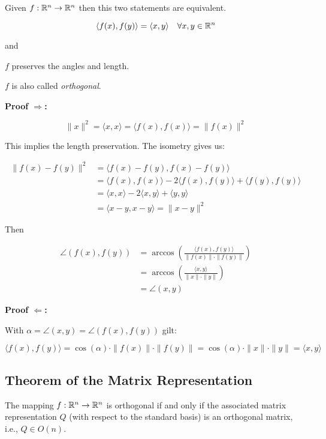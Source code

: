 Given \(f: \mathbb{R}^n \to \mathbb{R}^n\) then this two statements are equivalent.

\[
    \langle f(x), f(y) \rangle = \langle x, y \rangle \quad \forall x,y \in \mathbb{R}^n
\]

and 

\(f\) preserves the angles and length.

\(f\) is also called \emph{orthogonal}.

\textbf{Proof \(\Rightarrow\):}
 
\[
    \|x\|^2 = \langle x, x \rangle = \langle f(x), f(x) \rangle = \|f(x)\|^2
\]

This implies the length preservation. The isometry gives us:

\begin{align*}
    \|f(x) - f(y)\|^2 
    &= \langle f(x) - f(y), f(x) - f(y) \rangle \\
    &= \langle f(x), f(x) \rangle - 2\langle f(x), f(y) \rangle + \langle f(y), f(y) \rangle \\
    &= \langle x, x \rangle - 2\langle x, y \rangle + \langle y, y \rangle \\
    &= \langle x - y, x - y \rangle = \|x - y\|^2
\end{align*}

Then

\begin{align*}
    \angle(f(x), f(y)) 
    &= \arccos\left( \frac{\langle f(x), f(y) \rangle}{\|f(x)\| \cdot \|f(y)\|} \right) \\
    &= \arccos\left( \frac{\langle x, y \rangle}{\|x\| \cdot \|y\|} \right) \\
    &= \angle(x, y)
\end{align*}

\QED

\textbf{Proof \(\Leftarrow\):} 

With \(\alpha = \angle(x, y) = \angle(f(x), f(y))\) gilt:

\[
    \langle f(x), f(y) \rangle = \cos(\alpha) \cdot \|f(x)\| \cdot \|f(y)\| = \cos(\alpha) 
    \cdot \|x\| \cdot \|y\| = \langle x, y \rangle
\]

\QED

\subsection{Theorem of the Matrix Representation}

The mapping \( f : \mathbb{R}^n \to \mathbb{R}^n \) is orthogonal if and only if  
the associated matrix representation \( Q \) (with respect to the standard basis) is an orthogonal matrix, i.e., \( Q \in O(n) \).

